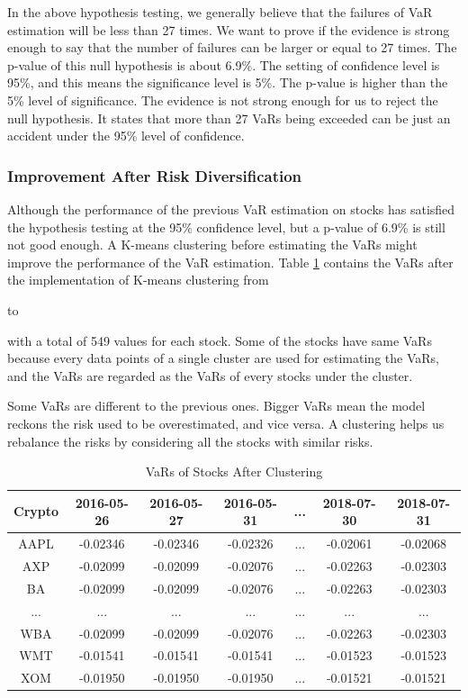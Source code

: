 \documentclass[11pt]{article} %
\theoremstyle{plain}
\theoremstyle{definition}
\begin{document}
In the above hypothesis testing, we generally believe that the failures of VaR estimation will be less than 27 times. We want to prove if the evidence is strong enough to say that the number of failures can be larger or equal to 27 times. The p-value of this null hypothesis is about 6.9\%. The setting of confidence level is 95\%, and this means the significance level is 5\%. The p-value is higher than the 5\% level of significance. The evidence is not strong enough for us to reject the null hypothesis. It states that more than 27 VaRs being exceeded can be just an accident under the 95\% level of confidence.

\subsubsection{Improvement After Risk Diversification}

Although the performance of the previous VaR estimation on stocks has satisfied the hypothesis testing at the 95\% confidence level, but a p-value of 6.9\% is still not good enough. A K-means clustering before estimating the VaRs might improve the performance of the VaR estimation. Table \ref{table:varstockafter} contains the VaRs after the implementation of K-means clustering from \date{26th May 2016} to \date{31st July 2018} with a total of 549 values for each stock. Some of the stocks have same VaRs because every data points of a single cluster are used for estimating the VaRs, and the VaRs are regarded as the VaRs of every stocks under the cluster.

Some VaRs are different to the previous ones. Bigger VaRs mean the model reckons the risk used to be overestimated, and vice versa. A clustering helps us rebalance the risks by considering all the stocks with similar risks.

{
  \begin{table}[ht]
    \centering
    \small
    \begin{tabular}{|c|c c c c c c|}
        \hline
        Crypto & 2016-05-26 & 2016-05-27 & 2016-05-31 & ... & 2018-07-30 & 2018-07-31 \\ [0.5ex]
        \hline
        AAPL & -0.02346 & -0.02346 & -0.02326 & ... & -0.02061 & -0.02068 \\
        \hline
        AXP & -0.02099 & -0.02099 & -0.02076 & ... & -0.02263 & -0.02303 \\
        \hline
        BA & -0.02099 & -0.02099 & -0.02076 & ... & -0.02263 & -0.02303 \\
        \hline
        ... & ... & ... & ... & ... & ... & ... \\
        \hline
        WBA & -0.02099 & -0.02099 & -0.02076 & ... & -0.02263 & -0.02303 \\
        \hline
        WMT & -0.01541 & -0.01541 & -0.01541 & ... & -0.01523 & -0.01523 \\
        \hline
        XOM & -0.01950 & -0.01950 & -0.01950 & ... & -0.01521 & -0.01521 \\
        \hline
    \end{tabular}
    \caption{VaRs of Stocks After Clustering}
    \label{table:varstockafter}
  \end{table}
}
\end{document}
